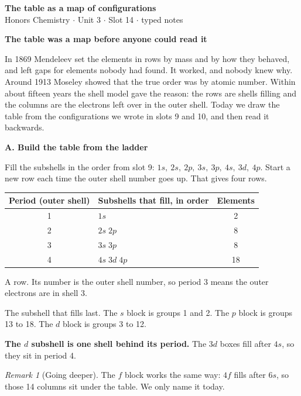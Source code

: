 \documentclass[11pt]{article}
\newcommand{\sect}[1]{\par\medskip\noindent\textbf{\large #1}\par\smallskip}
\theoremstyle{definition}\newtheorem*{example}{Example}\newtheorem*{method*}{Method}
\theoremstyle{remark}\newtheorem*{remark}{Remark}
\begin{document}
{\Large\textbf{The table as a map of configurations}}\\ Honors Chemistry $\cdot$ Unit 3 $\cdot$ Slot 14 $\cdot$ typed notes\par\medskip
\noindent{}\par\medskip

\sect{The table was a map before anyone could read it}
In 1869 Mendeleev set the elements in rows by mass and by how they behaved, and left gaps for elements nobody had found. It worked, and nobody knew why. Around 1913 Moseley showed that the true order was by atomic number. Within about fifteen years the shell model gave the reason: the rows are shells filling and the columns are the electrons left over in the outer shell. Today we draw the table from the configurations we wrote in slots 9 and 10, and then read it backwards.

\sect{A. Build the table from the ladder}
Fill the subshells in the order from slot 9: $1s,\ 2s,\ 2p,\ 3s,\ 3p,\ 4s,\ 3d,\ 4p$. Start a new row each time the outer shell number goes up. That gives four rows.\par\medskip
\begin{center}\begin{tabular}{@{}clc@{}}\toprule Period (outer shell) & Subshells that fill, in order & Elements\\\midrule
1 & $1s$ & 2\\
2 & $2s\;2p$ & 8\\
3 & $3s\;3p$ & 8\\
4 & $4s\;3d\;4p$ & 18\\\bottomrule\end{tabular}\end{center}
\begin{description}[leftmargin=1.2em,itemsep=2pt]
\item[Period] A row. Its number is the outer shell number, so period 3 means the outer electrons are in shell 3.
\item[Block] The subshell that fills last. The $s$ block is groups 1 and 2. The $p$ block is groups 13 to 18. The $d$ block is groups 3 to 12.
\end{description}\par
\textbf{The $d$ subshell is one shell behind its period.} The $3d$ boxes fill after $4s$, so they sit in period 4.
\begin{remark}[Going deeper]The $f$ block works the same way: $4f$ fills after $6s$, so those 14 columns sit under the table. We only name it today.\end{remark}
\end{document}
